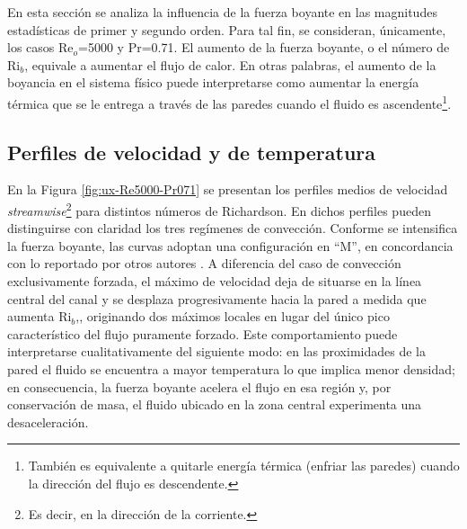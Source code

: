 En esta sección se analiza la influencia de la fuerza boyante en las magnitudes estadísticas de primer y segundo orden. Para tal fin, se consideran, únicamente, los casos Re$_o$=5000 y Pr=0.71. El aumento de la fuerza boyante, o el número de Ri$_b$, equivale a aumentar el flujo de calor. En otras palabras, el aumento de la boyancia en el sistema físico puede interpretarse como aumentar la energía térmica que se le entrega a través de las paredes cuando el fluido es ascendente\footnote{También es equivalente a quitarle energía térmica (enfriar las paredes) cuando la dirección del flujo es descendente.}.


\subsection{Perfiles de velocidad y de temperatura} \label{sec:velo_temp}

En la Figura \ref{fig:ux-Re5000-Pr071} se presentan los perfiles medios de velocidad  \textit{streamwise}\footnote{Es decir, en la dirección de la corriente.} para distintos números de Richardson. En dichos perfiles pueden distinguirse con claridad los tres regímenes de convección. Conforme se intensifica la fuerza boyante, las curvas adoptan una configuración en ``M'', en concordancia con lo reportado por otros autores \cite{you2003direct, zhou2024direct}. A diferencia del caso de convección exclusivamente forzada, el máximo de velocidad deja de situarse en la línea central del canal y se desplaza progresivamente hacia la pared a medida que aumenta Ri$_b$,\cite{carr1973velocity, steiner1971reverse, zhou2024direct}, originando dos máximos locales en lugar del único pico característico del flujo puramente forzado. Este comportamiento puede interpretarse cualitativamente del siguiente modo: en las proximidades de la pared el fluido se encuentra a mayor temperatura lo que implica menor densidad; en consecuencia, la fuerza boyante acelera el flujo en esa región y, por conservación de masa, el fluido ubicado en la zona central experimenta una desaceleración.

